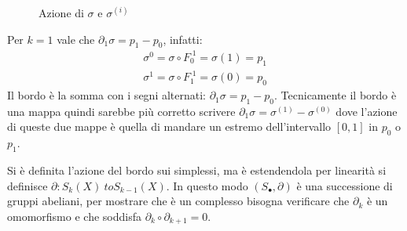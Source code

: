 \begin{figure}[htbp]
  \centering
  \caption{Azione di $ \sigma $ e $ \sigma^{(i)} $}
  \label{fig:lez1:sigma}
\end{figure}

\begin{example}[$ k = 1 $]
  Per $ k = 1 $ vale che $ \partial_1 \sigma = p_1 - p_0 $, infatti:
  \begin{align*}
    \sigma^{0} = \sigma \circ F_0^{\; 1} = \sigma(1) = p_1 \\
    \sigma^{1} = \sigma \circ F_1^{\; 1} = \sigma(0) = p_0
  \end{align*}
  Il bordo è la somma con i segni alternati: $ \partial_1 \sigma = p_1 - p_0 $. Tecnicamente
  il bordo è una mappa quindi sarebbe più corretto scrivere
  $ \partial_1 \sigma = \sigma^{(1)} - \sigma^{(0)} $ dove l'azione di queste due mappe è quella di
  mandare un estremo dell'intervallo $ [0,1] $ in $ p_0 $ o $ p_1 $.
\end{example}
Si è definita l'azione del bordo sui simplessi, ma è estendendola per linearità
si definisce $ \partial \colon S_k(X) \ to S_{k-1}(X) $. In questo modo
$ (S_\bullet, \partial) $ è una successione di gruppi abeliani, per mostrare che è un
complesso bisogna verificare che $ \partial_k $ è un omomorfismo e che soddisfa
$ \partial_k \circ \partial_{k+1} = 0 $.

